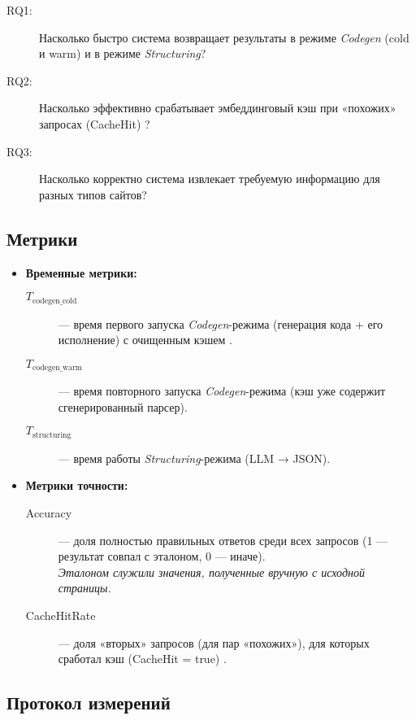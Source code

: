 \begin{description}
    \item[RQ1:] Насколько быстро система возвращает результаты в режиме \emph{Codegen} (cold и warm) и в режиме \emph{Structuring}?
    \item[RQ2:] Насколько эффективно срабатывает эмбеддинговый кэш при «похожих» запросах (CacheHit) \cite{Reimers2019, ChromaDBDocumentation}?
    \item[RQ3:] Насколько корректно система извлекает требуемую информацию для разных типов сайтов?
\end{description}

\subsection{Метрики}

\begin{itemize}
    \item \textbf{Временные метрики:}
    \begin{description}
        \item[$T_{\text{codegen\_cold}}$] — время первого запуска \emph{Codegen}-режима (генерация кода + его исполнение) с очищенным кэшем \cite{Dong2022CacheLLM}.
        \item[$T_{\text{codegen\_warm}}$] — время повторного запуска \emph{Codegen}-режима (кэш уже содержит сгенерированный парсер).
        \item[$T_{\text{structuring}}$] — время работы \emph{Structuring}-режима (LLM → JSON).
    \end{description}
    \item \textbf{Метрики точности:}
    \begin{description}
        \item[Accuracy] — доля полностью правильных ответов среди всех запросов (1 — результат совпал с эталоном, 0 — иначе). \\
        \emph{Эталоном служили значения, полученные вручную с исходной страницы.}
        \item[CacheHitRate] — доля «вторых» запросов (для пар «похожих»), для которых сработал кэш (CacheHit = true) \cite{Reimers2019}.
    \end{description}
\end{itemize}

\subsection{Протокол измерений}

